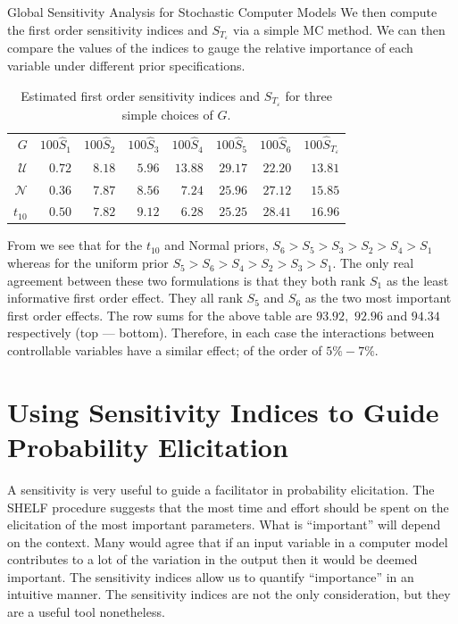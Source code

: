 \begin{chapter}{Global Sensitivity Analysis for Stochastic Computer Models}
We then compute the first order sensitivity indices and $S_{T_\varepsilon}$ via a simple MC method. We can then compare the values of the indices to gauge the relative importance of each variable under different prior specifications.

\begin{table}[ht]
\centering
\begin{tabular}{rrrrrrrr}
  \toprule
 $G$ & $100\hat{S}_1$ & $100\hat{S}_2$ & $100\hat{S}_3$ & $100\hat{S}_4$ & $100\hat{S}_5$ & $100\hat{S}_6$ & $100\hat{S}_{T_\varepsilon}$\\
  \cmidrule{1-8}
$\mathcal{U}$ & $0.72$ & $8.18$ & $5.96$ & $13.88$ & $29.17$ & $22.20$ & $13.81$\\
  $\mathcal{N}$ & $0.36$ & $7.87$ & $8.56$ & $7.24$ & $25.96$ & $27.12$ & $15.85$\\
  $t_{10}$ & $0.50$ & $7.82$ & $9.12$ & $6.28$ & $25.25$ & $28.41$ & $16.96$\\
   \bottomrule
\end{tabular}
\caption{Estimated first order sensitivity indices and $S_{T_\varepsilon}$ for three simple choices of $G$.}
\label{Tab:sa-sensitivity}
\end{table}


From  we see that for the $t_{10}$ and Normal priors, $S_6 >  S_5 > S_3 > S_2 > S_4 > S_1$ whereas for the uniform prior $S_5 > S_6 > S_4 > S_2 > S_3 > S_1$. The only real agreement between these two formulations is that they both rank $S_1$ as the least informative first order effect. They all rank $S_5$ and $S_6$ as the two most important first order effects. The row sums for the above table are $93.92,$ $92.96$ and $94.34$ respectively (top --- bottom). Therefore, in each case the interactions between controllable variables have a similar effect; of the order of $5\% - 7\%$.

\section{Using Sensitivity Indices to Guide Probability Elicitation}

A sensitivity is very useful to guide a facilitator in probability elicitation. The SHELF procedure \citep{SHELF4} suggests that the most time and effort should be spent on the elicitation of the most important parameters. What is ``important'' will depend on the context. Many would agree that if an input variable in a computer model contributes to a lot of the variation in the output then it would be deemed important. The sensitivity indices allow us to quantify ``importance'' in an intuitive manner. The sensitivity indices are not the only consideration, but they are  a useful tool nonetheless.\\


\end{chapter}
